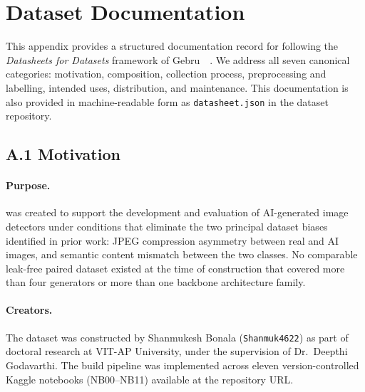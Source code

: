 
\section{Dataset Documentation}
\label{sec:datasheet}

This appendix provides a structured documentation record for
\textbf{\datasetname} following the \emph{Datasheets for Datasets}
framework of Gebru~\etal~\cite{gebru2021datasheets}.
We address all seven canonical categories: motivation, composition,
collection process, preprocessing and labelling, intended uses,
distribution, and maintenance.
This documentation is also provided in machine-readable form as
\texttt{datasheet.json} in the dataset repository.

\subsection*{A.1 \quad Motivation}
\label{ssec:ds_motivation}

\paragraph{Purpose.}
\textbf{\datasetname} was created to support the development and
evaluation of AI-generated image detectors under conditions that
eliminate the two principal dataset biases identified in prior work:
JPEG compression asymmetry between real and AI images, and semantic
content mismatch between the two classes.
No comparable leak-free paired dataset existed at the time of
construction that covered more than four generators or more than one
backbone architecture family.

\paragraph{Creators.}
The dataset was constructed by Shanmukesh Bonala
(\texttt{Shanmuk4622}) as part of doctoral research at VIT-AP
University, under the supervision of Dr.~Deepthi Godavarthi.
The build pipeline was implemented across eleven version-controlled
Kaggle notebooks (NB00--NB11) available at the repository URL.

